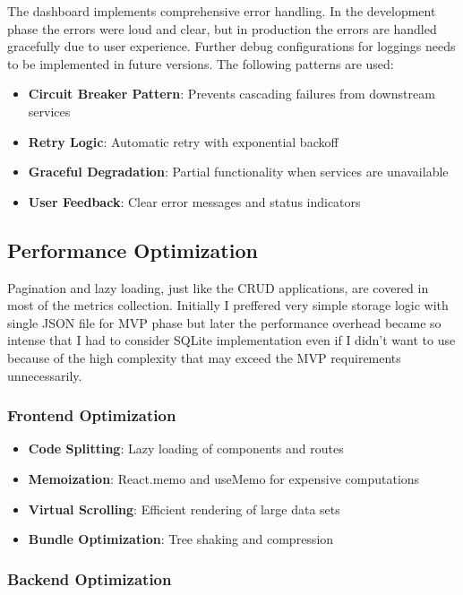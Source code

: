The dashboard implements comprehensive error handling. In the development phase the errors were loud and clear, but in production the errors are handled gracefully due to user experience. Further debug configurations for loggings needs to be implemented in future versions. The following patterns are used:

\begin{itemize}
    \item \textbf{Circuit Breaker Pattern}: Prevents cascading failures from downstream services
    \item \textbf{Retry Logic}: Automatic retry with exponential backoff
    \item \textbf{Graceful Degradation}: Partial functionality when services are unavailable
    \item \textbf{User Feedback}: Clear error messages and status indicators
\end{itemize}

\subsection{Performance Optimization}
Pagination and lazy loading, just like the CRUD applications, are covered in most of the metrics collection. Initially I preffered very simple storage logic with single JSON file for MVP phase but later the performance overhead became so intense that I had to consider SQLite implementation even if I didn't want to use because of the high complexity that may exceed the MVP requirements unnecessarily.

\subsubsection{Frontend Optimization}

\begin{itemize}
    \item \textbf{Code Splitting}: Lazy loading of components and routes
    \item \textbf{Memoization}: React.memo and useMemo for expensive computations
    \item \textbf{Virtual Scrolling}: Efficient rendering of large data sets
    \item \textbf{Bundle Optimization}: Tree shaking and compression
\end{itemize}

\subsubsection{Backend Optimization}

